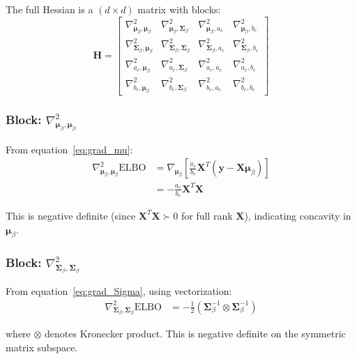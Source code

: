 \documentclass[11pt]{article}
\newcommand{\ELBO}{\text{ELBO}}
\begin{document}
The full Hessian is a $(d \times d)$ matrix with blocks:
\begin{equation}
\bm{H} = \begin{bmatrix}
\nabla^2_{\bm{\mu}_\beta, \bm{\mu}_\beta} & \nabla^2_{\bm{\mu}_\beta, \bm{\Sigma}_\beta} & \nabla^2_{\bm{\mu}_\beta, a_e} & \nabla^2_{\bm{\mu}_\beta, b_e} \\
\nabla^2_{\bm{\Sigma}_\beta, \bm{\mu}_\beta} & \nabla^2_{\bm{\Sigma}_\beta, \bm{\Sigma}_\beta} & \nabla^2_{\bm{\Sigma}_\beta, a_e} & \nabla^2_{\bm{\Sigma}_\beta, b_e} \\
\nabla^2_{a_e, \bm{\mu}_\beta} & \nabla^2_{a_e, \bm{\Sigma}_\beta} & \nabla^2_{a_e, a_e} & \nabla^2_{a_e, b_e} \\
\nabla^2_{b_e, \bm{\mu}_\beta} & \nabla^2_{b_e, \bm{\Sigma}_\beta} & \nabla^2_{b_e, a_e} & \nabla^2_{b_e, b_e}
\end{bmatrix}
\end{equation}

\subsubsection{Block: \texorpdfstring{$\nabla^2_{\bm{\mu}_\beta, \bm{\mu}_\beta}$}{Hessian mu-mu}}

From equation~\eqref{eq:grad_mu}:
\begin{align}
\nabla^2_{\bm{\mu}_\beta, \bm{\mu}_\beta} \ELBO &= \nabla_{\bm{\mu}_\beta}\left[\frac{a_e}{b_e} \bm{X}^T(\bm{y} - \bm{X}\bm{\mu}_\beta)\right] \nonumber\\
&= -\frac{a_e}{b_e} \bm{X}^T\bm{X}
\label{eq:hess_mumu}
\end{align}

This is negative definite (since $\bm{X}^T\bm{X} \succ 0$ for full rank $\bm{X}$), indicating concavity in $\bm{\mu}_\beta$.

\subsubsection{Block: \texorpdfstring{$\nabla^2_{\bm{\Sigma}_\beta, \bm{\Sigma}_\beta}$}{Hessian Sigma-Sigma}}

From equation~\eqref{eq:grad_Sigma}, using vectorization:
\begin{align}
\nabla^2_{\bm{\Sigma}_\beta, \bm{\Sigma}_\beta} \ELBO &= -\frac{1}{2}(\bm{\Sigma}_\beta^{-1} \otimes \bm{\Sigma}_\beta^{-1})
\end{align}

where $\otimes$ denotes Kronecker product. This is negative definite on the symmetric matrix subspace.
\end{document}
